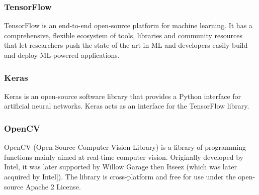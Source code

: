     \subsubsection{TensorFlow}
    TensorFlow is an end-to-end open-source platform for machine learning. It has a comprehensive, flexible ecosystem of tools, 
    libraries and community resources that let researchers push the state-of-the-art in ML and developers easily build and deploy ML-powered applications.

    \subsubsection{Keras}
    Keras is an open-source software library that provides a Python interface for artificial neural networks. Keras acts as an interface for the TensorFlow library.
    
    \subsubsection{OpenCV}
    OpenCV (Open Source Computer Vision Library) is a library of programming functions mainly aimed at real-time computer vision. Originally developed by Intel, 
    it was later supported by Willow Garage then Itseez (which was later acquired by Intel]). The library is cross-platform and free for use under the open-source Apache 2 License. 